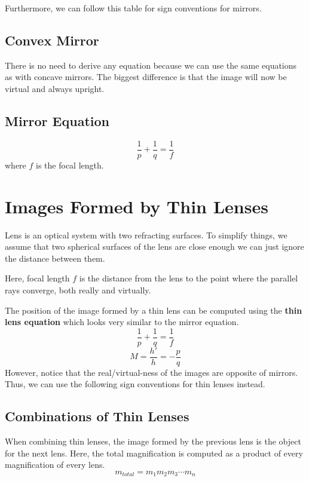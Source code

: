 Furthermore, we can follow this table for sign conventions for mirrors.

\subsection{Convex Mirror}

There is no need to derive any equation because we can use the same equations as with concave mirrors.
The biggest difference is that the image will now be virtual and always upright.

\subsection{Mirror Equation}

\begin{equation}
    \frac{1}{p} + \frac{1}{q} = \frac{1}{f}
\end{equation}
where $f$ is the focal length.

\section{Images Formed by Thin Lenses}

Lens is an optical system with two refracting surfaces. To simplify things, we assume that two 
spherical surfaces of the lens are close enough we can just ignore the distance between them.

Here, focal length $f$ is the distance from the lens to the point where the parallel rays converge,
both really and virtually.

The position of the image formed by a thin lens can be computed using the \textbf{thin lens equation}
which looks very similar to the mirror equation.
\begin{equation}
    \frac{1}{p} + \frac{1}{q} = \frac{1}{f}
\end{equation}
\begin{equation}
    M = \frac{h'}{h} = - \frac{p}{q}
\end{equation}
However, notice that the real/virtual-ness of the images are opposite of mirrors. Thus, we can use 
the following sign conventions for thin lenses instead.

\subsection{Combinations of Thin Lenses}

When combining thin lenses, the image formed by the previous lens is the object for the next lens.
Here, the total magnification is computed as a product of every magnification of every lens.
\[ m_{total} = m_1 m_2 m_3 \cdots m_n \]